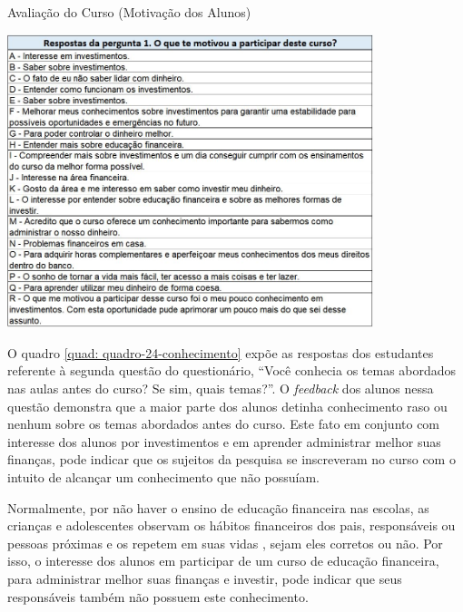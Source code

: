 \graphicspath{{quadros/}} 
\begin{quadro}[!ht]
\centering
\begin{minipage}{0.8\textwidth}
\caption{Avaliação do Curso (Motivação dos Alunos)}
\centering
\includegraphics[width=0.80\textwidth]{quadro-23-motivou}
\label{quad: quadro-23-motivou}
\end{minipage}
\end{quadro}

O quadro \ref{quad: quadro-24-conhecimento} expõe as respostas dos estudantes referente à segunda questão do questionário, “Você conhecia os temas abordados nas aulas antes do curso? Se sim, quais temas?”. O \textit{feedback} dos alunos nessa questão demonstra que a maior parte dos alunos detinha conhecimento raso ou nenhum sobre os temas abordados antes do curso. Este fato em conjunto com interesse dos alunos por investimentos e em aprender administrar melhor suas finanças, pode indicar que os sujeitos da pesquisa se inscreveram no curso com o intuito de alcançar um conhecimento que não possuíam.

Normalmente, por não haver o ensino de educação financeira nas escolas, as crianças e adolescentes observam os hábitos financeiros dos pais, responsáveis ou pessoas próximas e os repetem em suas vidas \cite{herculano2005}, sejam eles corretos ou não. Por isso, o interesse dos alunos em participar de um curso de educação financeira, para administrar melhor suas finanças e investir, pode indicar que seus responsáveis também não possuem este conhecimento.

